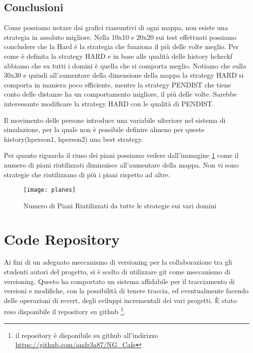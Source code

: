 \newpage
\section{Conclusioni}
Come possiamo notare dai grafici riassuntivi di ogni mappa, non esiste una strategia in assoluto migliore. Nella 10x10 e 20x20 sui test effettuati possiamo concludere che la Hard è la strategia che funziona il più delle volte meglio. Per come è definita la strategy HARD e in base alle qualità delle history hcheckf abbiamo che su tutti i domini è quella che si comporta meglio.
Notiamo che sulla 30x30 e quindi all'aumentare della dimensione della mappa la strategy HARD si comporta in maniera poco efficiente, mentre la strategy PENDIST che tiene conto delle distanze ha un comportamento migliore, il più delle volte. Sarebbe interessante modificare la strategy HARD con le qualità di PENDIST.

Il movimento delle persone introduce una variabile ulteriore nel sistema di simulazione, per la quale non è possibile definire almeno per queste history(hperson1, hperson2) una best strategy.

Per quanto riguarda il riuso dei piani possiamo vedere dall'immagine \ref{fig:figure13} come il numero di piani riutilizzati diminuisce all'aumentare della mappa. Non vi sono strategie che riutilizzano di più i piani rispetto ad altre.
\begin{figure}[h!tp]
  \texttt{[image: planes]}
  \caption{Numero di Piani Riutilizzati da tutte le strategie sui vari domini}
  \label{fig:figure13}
\end{figure}


\appendix
\chapter{Code Repository}

Ai fini di un adeguato meccanismo di versioning per la collaborazione tra gli studenti autori del progetto, si è scelto di utilizzare git come meccanismo di versioning.
Questo ha comportato un sistema affidabile per il tracciamento di versioni e modifiche, con la possibilità di tenere traccia, ed eventualmente facendo delle operazioni di revert, degli sviluppi incrementali dei vari progetti.
È stato reso disponibile il repository su github \footnote{il repository è disponibile su github all'indirizzo \url{https://github.com/andr3a87/NG_Cafe} }.
